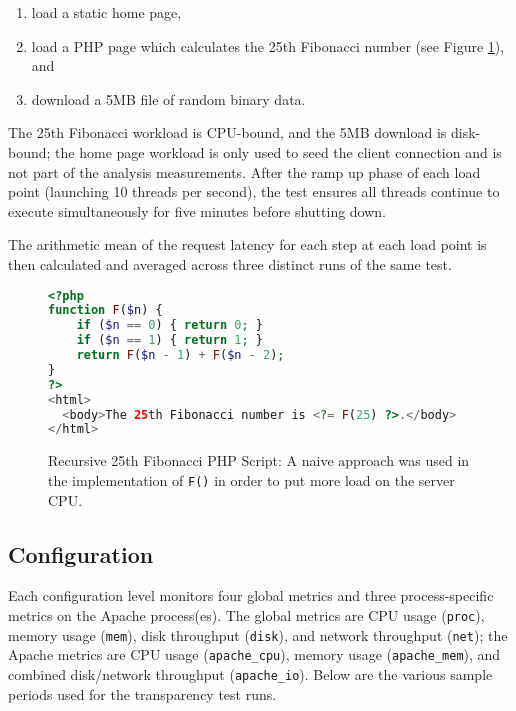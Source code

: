\begin{enumerate}
\item load a static home page,
\item load a PHP page which calculates the 25th Fibonacci number (see Figure \ref{fig:fib25_list}), and
\item download a 5MB file of random binary data.
\end{enumerate}

The 25th Fibonacci workload is CPU-bound, and the 5MB download is disk-bound; the home page workload is only used to
seed the client connection and is not part of the analysis measurements. After the ramp up phase of each load point
(launching 10 threads per second), the test ensures all threads continue to execute simultaneously for five minutes
before shutting down.

The arithmetic mean of the request latency for each step at each load point is then calculated and averaged across three
distinct runs of the same test.

\begin{figure}[H]
\vspace{+10pt}
\begin{lstlisting}[language=php,frame=single,basicstyle=\footnotesize\ttfamily]
<?php
function F($n) {
    if ($n == 0) { return 0; }
    if ($n == 1) { return 1; }
    return F($n - 1) + F($n - 2);
}
?>
<html>
  <body>The 25th Fibonacci number is <?= F(25) ?>.</body>
</html>
\end{lstlisting}
\vspace{-10pt}
\caption[Recursive 25th Fibonacci PHP Script]
	{Recursive 25th Fibonacci PHP Script: A naive approach was used in the implementation of \texttt{F()} in order
	 to put more load on the server CPU.}
\label{fig:fib25_list}
\end{figure}

\subsection{\dcamp Configuration}

Each \dcamp configuration level monitors four global metrics and three process-specific metrics on the Apache
process(es). The global metrics are CPU usage (\texttt{proc}), memory usage (\texttt{mem}), disk throughput
(\texttt{disk}), and network throughput (\texttt{net}); the Apache metrics are CPU usage (\texttt{apache\_cpu}), memory
usage (\texttt{apache\_mem}), and combined disk/network throughput (\texttt{apache\_io}). Below are the various sample
periods used for the transparency test runs.

